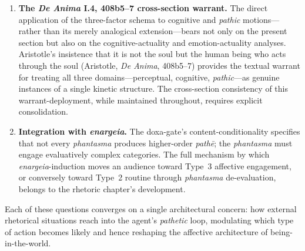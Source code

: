 \documentclass{article}
\begin{document}
\begin{enumerate}
p.~114) and Burke's attention to how purposive orientation transforms indeterminate experience into motivated symbolic action (Burke, \textit{A Grammar of Motives}, pp.~311--312) will jointly furnish the external-modulation framework. Similarly, Gross's affordance-theoretic reconception of rhetoric as disclosing situations that are ``threatening and promising with respect to our human being-in-the-world'' will anchor the analysis of \textit{Mitsein}-mediated persuasion. \item \textbf{The \textit{De Anima} I.4, 408b5--7 cross-section warrant.} The direct application of the three-factor schema to cognitive and \textit{pathic} motions---rather than its merely analogical extension---bears not only on the present section but also on the cognitive-actuality and emotion-actuality analyses. Aristotle's insistence that it is not the soul but the human being who acts through the soul (Aristotle, \textit{De Anima}, 408b5--7) provides the textual warrant for treating all three domains---perceptual, cognitive, \textit{pathic}---as genuine instances of a single kinetic structure. The cross-section consistency of this warrant-deployment, while maintained throughout, requires explicit consolidation. \item \textbf{Integration with \textit{enargeia}.} The doxa-gate's content-conditionality specifies that not every \textit{phantasma} produces higher-order \textit{pathē}; the \textit{phantasma} must engage evaluatively complex categories. The full mechanism by which \textit{enargeia}-induction moves an audience toward Type~3 affective engagement, or conversely toward Type~2 routine through \textit{phantasma} de-evaluation, belongs to the rhetoric chapter's development. \end{enumerate}

Each of these questions converges on a single architectural concern: how external rhetorical situations reach into the agent's \textit{pathetic} loop, modulating which type of action becomes likely and hence reshaping the affective architecture of being-in-the-world.

\end{document}
